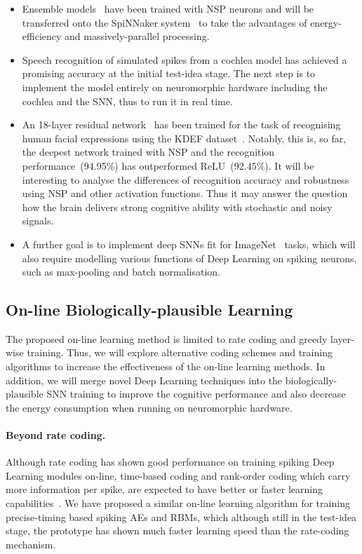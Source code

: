 \begin{itemize}
	\item Ensemble models~\citep{krogh1995neural} have been trained with NSP neurons and will be transferred onto the SpiNNaker system~\citep{furber2014spinnaker} to take the advantages of energy-efficiency and massively-parallel processing.
	\item Speech recognition of simulated spikes from a cochlea model has achieved a promising accuracy at the initial test-idea stage.
	The next step is to implement the model entirely on neuromorphic hardware including the cochlea and the SNN, thus to run it in real time.
	\item An 18-layer residual network~\citep{he2016deep} has been trained for the task of recognising human facial expressions using the KDEF dataset~\citep{lundqvist1998karolinska}.
	Notably, this is, so far, the deepest network trained with NSP and the recognition performance~(94.95\%) has outperformed ReLU~(92.45\%).
	It will be interesting to analyse the differences of recognition accuracy and robustness using NSP and other activation functions.
	Thus it may answer the question how the brain delivers strong cognitive ability with stochastic and noisy signals.
 	\item A further goal is to implement deep SNNs fit for ImageNet~\citep{deng2009imagenet} tasks, which will also require modelling various functions of Deep Learning on spiking neurons, such as max-pooling and batch normalisation. 

\end{itemize}


\subsection{On-line Biologically-plausible Learning}
The proposed on-line learning method is limited to rate coding and greedy layer-wise training.
Thus, we will explore alternative coding schemes and training algorithms to increase the effectiveness of the on-line learning methods.
In addition, we will merge novel Deep Learning techniques into the biologically-plausible SNN training to improve the cognitive performance and also decrease the energy consumption when running on neuromorphic hardware.
\paragraph{Beyond rate coding.}
Although rate coding has shown good performance on training spiking Deep Learning modules on-line, time-based coding and rank-order coding which carry more information per spike, are expected to have better or faster learning capabilities~\citep{gautrais1998rate}.
We have proposed a similar on-line learning algorithm for training precise-timing based spiking AEs and RBMs, which although still in the test-idea stage, the prototype has shown much faster learning speed than the rate-coding mechanism.

